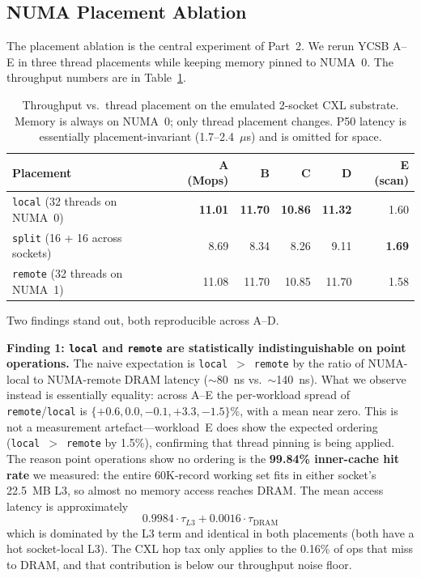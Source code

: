 \documentclass[11pt]{article}
\begin{document}
\subsection{NUMA Placement Ablation}
\label{sec:placement}
The placement ablation is the central experiment of Part~2. We rerun YCSB A--E in three thread placements while keeping memory pinned to NUMA~0. The throughput numbers are in Table~\ref{tab:p2_placement}.

\begin{table}[h]
\centering
\small
\begin{tabular}{@{}lrrrrr@{}}
\toprule
\textbf{Placement} & \textbf{A (Mops)} & \textbf{B} & \textbf{C} & \textbf{D} & \textbf{E (scan)} \\ \midrule
\texttt{local}  (32 threads on NUMA~0)  & \textbf{11.01} & \textbf{11.70} & \textbf{10.86} & \textbf{11.32} & 1.60 \\
\texttt{split}  (16 + 16 across sockets) & 8.69  & 8.34  & 8.26  & 9.11  & \textbf{1.69} \\
\texttt{remote} (32 threads on NUMA~1)  & 11.08 & 11.70 & 10.85 & 11.70 & 1.58 \\ \bottomrule
\end{tabular}
\caption{Throughput vs.\ thread placement on the emulated 2-socket CXL substrate. Memory is always on NUMA~0; only thread placement changes. P50 latency is essentially placement-invariant (1.7--2.4~$\mu$s) and is omitted for space.}
\label{tab:p2_placement}
\end{table}

Two findings stand out, both reproducible across A--D.

\textbf{Finding 1: \texttt{local} and \texttt{remote} are statistically indistinguishable on point operations.} The naive expectation is \texttt{local}~$>$~\texttt{remote} by the ratio of NUMA-local to NUMA-remote DRAM latency ($\sim$80~ns vs.\ $\sim$140~ns). What we observe instead is essentially equality: across A--E the per-workload spread of \texttt{remote}/\texttt{local} is $\{+0.6, 0.0, -0.1, +3.3, -1.5\}\%$, with a mean near zero. This is not a measurement artefact---workload~E does show the expected ordering (\texttt{local}~$>$~\texttt{remote} by 1.5\%), confirming that thread pinning is being applied. The reason point operations show no ordering is the \textbf{99.84\% inner-cache hit rate} we measured: the entire 60K-record working set fits in either socket's 22.5~MB L3, so almost no memory access reaches DRAM. The mean access latency is approximately
\[
0.9984 \cdot \tau_{L3} + 0.0016 \cdot \tau_{\text{DRAM}}
\]
which is dominated by the L3 term and identical in both placements (both have a hot socket-local L3). The CXL hop tax only applies to the 0.16\% of ops that miss to DRAM, and that contribution is below our throughput noise floor.
\end{document}
